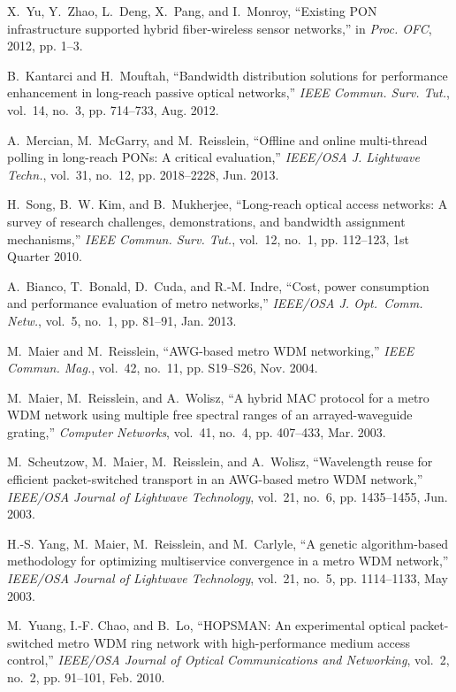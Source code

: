 \documentclass[article]{IEEEtran}
\begin{document}
\begin{thebibliography}{100}
X.~Yu, Y.~Zhao, L.~Deng, X.~Pang, and I.~Monroy, ``Existing {PON}
  infrastructure supported hybrid fiber-wireless sensor networks,'' in
  \emph{Proc. OFC}, 2012, pp. 1--3.

B.~Kantarci and H.~Mouftah, ``Bandwidth distribution solutions for performance
  enhancement in long-reach passive optical networks,'' \emph{IEEE Commun.
  Surv. Tut.}, vol.~14, no.~3, pp. 714--733, Aug. 2012.

A.~Mercian, M.~McGarry, and M.~Reisslein, ``Offline and online multi-thread
  polling in long-reach {PONs}: A critical evaluation,'' \emph{IEEE/OSA J.
  Lightwave Techn.}, vol.~31, no.~12, pp. 2018--2228, Jun. 2013.

H.~Song, B.~W. Kim, and B.~Mukherjee, ``Long-reach optical access networks: A
  survey of research challenges, demonstrations, and bandwidth assignment
  mechanisms,'' \emph{IEEE Commun. Surv. Tut.}, vol.~12, no.~1, pp. 112--123,
  1st Quarter 2010.

A.~Bianco, T.~Bonald, D.~Cuda, and R.-M. Indre, ``Cost, power consumption and
  performance evaluation of metro networks,'' \emph{IEEE/OSA J. Opt.\ Comm.
  Netw.}, vol.~5, no.~1, pp. 81--91, Jan. 2013.

M.~Maier and M.~Reisslein, ``{AWG}-based metro {WDM} networking,'' \emph{IEEE
  Commun. Mag.}, vol.~42, no.~11, pp. S19--S26, Nov. 2004.

M.~Maier, M.~Reisslein, and A.~Wolisz, ``A hybrid {MAC} protocol for a metro
  {WDM} network using multiple free spectral ranges of an arrayed-waveguide
  grating,'' \emph{Computer Networks}, vol.~41, no.~4, pp. 407--433, Mar. 2003.

M.~Scheutzow, M.~Maier, M.~Reisslein, and A.~Wolisz, ``Wavelength reuse for
  efficient packet-switched transport in an {AWG}-based metro {WDM} network,''
  \emph{IEEE/OSA Journal of Lightwave Technology}, vol.~21, no.~6, pp.
  1435--1455, Jun. 2003.

H.-S. Yang, M.~Maier, M.~Reisslein, and M.~Carlyle, ``A genetic algorithm-based
  methodology for optimizing multiservice convergence in a metro {WDM}
  network,'' \emph{IEEE/OSA Journal of Lightwave Technology}, vol.~21, no.~5,
  pp. 1114--1133, May 2003.

M.~Yuang, I.-F. Chao, and B.~Lo, ``{HOPSMAN}: An experimental optical
  packet-switched metro {WDM} ring network with high-performance medium access
  control,'' \emph{IEEE/OSA Journal of Optical Communications and Networking},
  vol.~2, no.~2, pp. 91--101, Feb. 2010.

\end{thebibliography}
\end{document}
